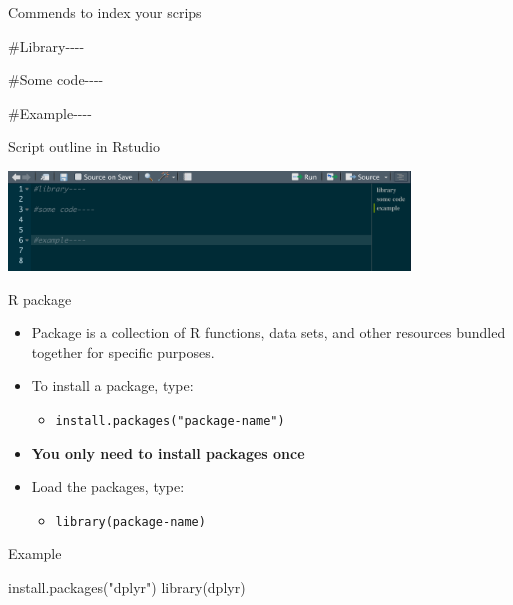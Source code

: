 \documentclass[
  ignorenonframetext,
  aspectratio=169,
]{beamer}
\newenvironment{Shaded}{\begin{snugshade}}{\end{snugshade}}
\newcommand{\CommentTok}[1]{\textcolor[rgb]{0.37,0.37,0.37}{#1}}
\newcommand{\FunctionTok}[1]{\textcolor[rgb]{0.28,0.35,0.67}{#1}}
\newcommand{\NormalTok}[1]{\textcolor[rgb]{0.00,0.23,0.31}{#1}}
\newcommand{\StringTok}[1]{\textcolor[rgb]{0.13,0.47,0.30}{#1}}
\providecommand{\tightlist}{%
  \setlength{\itemsep}{0pt}\setlength{\parskip}{0pt}}\usepackage{longtable,booktabs,array}
\begin{document}
\begin{frame}[fragile]{Commends to index your scrips}
\label{commends-to-index-your-scrips}
\begin{Shaded}
\begin{Highlighting}[]
\CommentTok{\#Library{-}{-}{-}{-}}

\CommentTok{\#Some code{-}{-}{-}{-} }

\CommentTok{\#Example{-}{-}{-}{-}}
\end{Highlighting}
\end{Shaded}

Script outline in Rstudio

\includegraphics[width=0.8\textwidth,height=\textheight]{Intro_R_files/mediabag/4yjqd.png}
\end{frame}

\begin{frame}[fragile]{R package}
\label{r-package}
\begin{itemize}
\item
  Package is a collection of R functions, data sets, and other resources
  bundled together for specific purposes.
\item
  To install a package, type:

  \begin{itemize}
  \tightlist
  \item
    \texttt{install.packages("package-name")}
  \end{itemize}
\item
  \textbf{You only need to install packages once}
\item
  Load the packages, type:

  \begin{itemize}
  \tightlist
  \item
    \texttt{library(package-name)}
  \end{itemize}
\end{itemize}
\end{frame}

\begin{frame}[fragile]{Example}
\label{example}
\begin{Shaded}
\begin{Highlighting}[]
\FunctionTok{install.packages}\NormalTok{(}\StringTok{"dplyr"}\NormalTok{)}
\FunctionTok{library}\NormalTok{(dplyr)}
\end{Highlighting}
\end{Shaded}
\end{frame}
\end{document}
